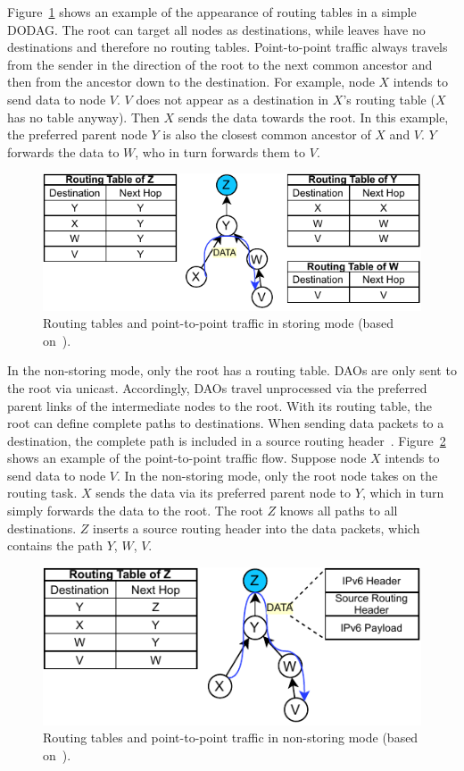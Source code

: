 \documentclass[english,version-2019-11]{uzl-thesis}
\begin{document}
Figure~\ref{StoringMode} shows an example of the appearance of routing
tables in a simple DODAG. The root can target all nodes as destinations,
while leaves have no destinations and therefore no routing tables.
Point-to-point traffic always travels from the sender in the direction
of the root to the next common ancestor and then from the
ancestor down to the destination. For example, node $X$ intends to send
data to node $V$. $V$ does not appear as a destination in $X$'s routing
table ($X$ has no table anyway). Then $X$ sends the data towards
the root. In this example, the preferred parent node $Y$ is also
the closest common ancestor of $X$ and $V$. $Y$ forwards the data
to $W$, who in turn forwards them to $V$.
\begin{figure}[htpb]
  \centering
  \includegraphics{StoringMode.pdf}
  \caption{Routing tables and point-to-point traffic in storing mode (based on~\cite{RPLHybridMode}).}
  \label{StoringMode}
\end{figure}

In the non-storing mode, only the root has a routing table.
DAOs are only sent to the root via unicast. Accordingly,
DAOs travel unprocessed via the preferred parent links
of the intermediate nodes to the root. With its routing table,
the root can define complete paths to destinations.
When sending data packets to a destination, the complete path
is included in a source routing header~\cite{RPLHybridMode}.
Figure~\ref{NonStoringMode} shows an example of the point-to-point traffic flow.
Suppose node $X$ intends to send data to node $V$.
In the non-storing mode, only the root node takes
on the routing task. $X$ sends the data via its preferred
parent node to $Y$, which in turn simply forwards
the data to the root. The root $Z$ knows all paths
to all destinations. $Z$ inserts a source routing
header into the data packets, which 
contains the path $Y$, $W$, $V$.
\begin{figure}[htpb]
  \centering
  \includegraphics{NonStoringMode.pdf}
  \caption{Routing tables and point-to-point traffic in non-storing mode (based on~\cite{RPLHybridMode}).}
  \label{NonStoringMode}
\end{figure}
\end{document}
